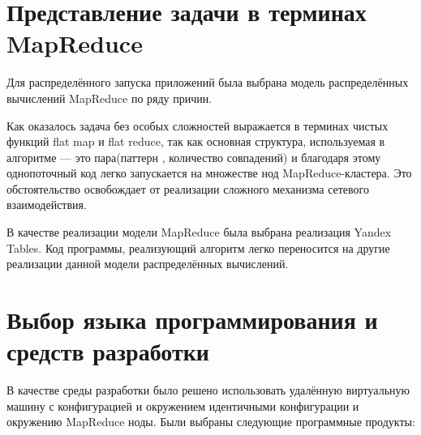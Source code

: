 \section{Представление задачи в терминах MapReduce}
Для распределённого запуска приложений была выбрана модель распределённых
вычислений MapReduce\footnotemark
{}
по ряду причин.

Как оказалось задача без особых сложностей выражается в терминах
чистых функций flat map и flat reduce, так как основная структура,
используемая в алгоритме --- это пара(паттерн\footnotemark
{},
количество совпадений) и благодаря этому однопоточный код легко запускается
на множестве нод MapReduce-кластера. Это обстоятельство освобождает
от реализации сложного механизма сетевого взаимодействия.

В качестве реализации модели MapReduce была выбрана реализация
Yandex Tables. Код программы, реализующий алгоритм легко переносится
на другие реализации данной модели распределённых вычислений.


\section{Выбор языка программирования и средств разработки}
В качестве среды разработки было решено использовать удалённую виртуальную
машину с конфигурацией и окружением идентичными конфигурации и окружению
MapReduce ноды. Были выбраны следующие программные продукты:

